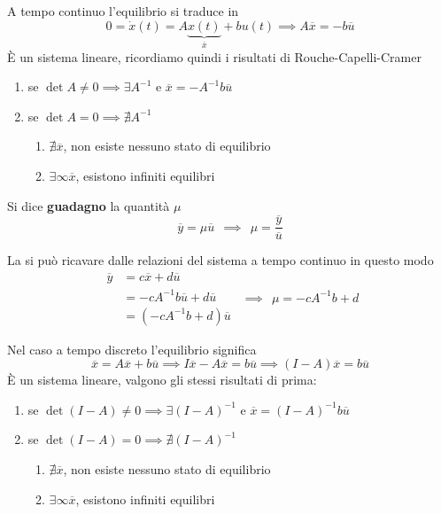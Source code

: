 A tempo continuo l'equilibrio si traduce in
\begin{equation*}
	0=\dot{x} (t)=A\underbrace{x(t)}_{\overline{x}} +bu(t)\implies A\overline{x} =-b\overline{u}
\end{equation*}
È un sistema lineare, ricordiamo quindi i risultati di Rouche-Capelli-Cramer
\begin{enumerate}
	\item se $\det A\neq 0\implies \exists A^{-1}$ e $\boxed{\overline{x} =-A^{-1} b\overline{u}}$
	\item se $\det A=0\implies \nexists A^{-1}$
	      \begin{enumerate}
	      	\item $\nexists \overline{x}$, non esiste nessuno stato di equilibrio
	      	\item $\exists \infty \overline{x}$, esistono infiniti equilibri
	      \end{enumerate}
\end{enumerate}
\begin{defn}
	Si dice \textbf{guadagno} la quantità $\mu $
	\begin{equation*}
		\overline{y} =\mu \overline{u} \ \ \implies \ \ \boxed{\mu =\frac{\overline{y}}{\overline{u}}}
	\end{equation*}
\end{defn}
La si può ricavare dalle relazioni del sistema a tempo continuo in questo modo
\begin{equation*}
	\begin{aligned}
		\overline{y} & =c\overline{x} +d\overline{u}           \\
		             & =-cA^{-1} b\overline{u} +d\overline{u}  \\
		             & =\left(-cA^{-1} b+d\right)\overline{u} 
	\end{aligned} \ \ \implies \ \ \boxed{\mu =-cA^{-1} b+d}
\end{equation*}

Nel caso a tempo discreto l'equilibrio significa
\begin{equation*}
	\overline{x} =A\overline{x} +b\overline{u} \implies I\overline{x} -A\overline{x} =b\overline{u} \implies (I-A)\overline{x} =b\overline{u}
\end{equation*}
È un sistema lineare, valgono gli stessi risultati di prima:
\begin{enumerate}
	\item se $\det(I-A) \neq 0\implies \exists (I-A)^{-1}$ e $\boxed{\overline{x} =(I-A)^{-1} b\overline{u}}$
	\item se $\det(I-A) =0\implies \nexists (I-A)^{-1}$
	      \begin{enumerate}
	      	\item $\nexists \overline{x}$, non esiste nessuno stato di equilibrio
	      	\item $\exists \infty \overline{x}$, esistono infiniti equilibri
	      \end{enumerate}
\end{enumerate}

